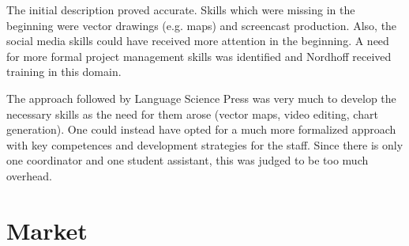 \documentclass[nonflat,smallfont
]{langsci/langscibook}
\newcommand{\evaluation}[1]{
  \renewcommand{\tblslinecolour}{lsLightOrange}
  \tblssy{receipt}{Evaluation}{\vspace*{-5mm}#1}
}
\newcommand{\othersolutions}[1]{
  \renewcommand{\tblslinecolour}{lsDarkGreenOne}
  \tblssy{more}{Other solutions}{\vspace*{-5mm}#1}
}
\renewcommand{\tblssy}[4][black!12]{%
  \renewcommand{\langscisymbol}{#2}\renewcommand{\tblsboxcolor}{#1}
  \begin{mdframed}[style=yellowexercise,frametitle={#3}]
    #4
  \end{mdframed}
}
\begin{document}
\evaluation{The initial description proved accurate. Skills which were missing in the beginning were vector drawings (e.g. maps) and screencast production. Also, the social media skills could have received more attention in the beginning.  A need for more formal project management skills was identified and Nordhoff received training in this domain.}
\othersolutions{The approach followed by Language Science Press was very much to develop the necessary skills as the need for them arose (vector maps, video editing, chart generation). One could instead have opted for a much more formalized approach with key competences and development strategies for the staff. Since there is only one coordinator and one student assistant, this was judged to be too much overhead.}


\chapter{Market}
\end{document}
